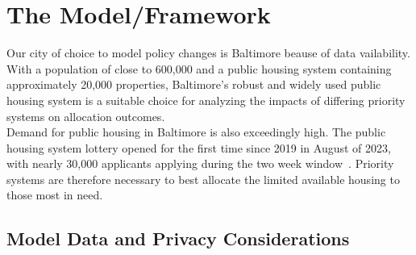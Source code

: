 \documentclass[11pt]{article}
\begin{document}
\newpage
\section{The Model/Framework}
\noindent
Our city of choice to model policy changes is Baltimore beause of data vailability. With a population of close to 600,000 and a public housing system containing approximately 20,000 properties, Baltimore's robust and widely used public housing system is a suitable choice for analyzing the impacts of differing priority systems on allocation outcomes. \\
\newline
Demand for public housing in Baltimore is also exceedingly high. The public housing system lottery opened for the first time since 2019 in August of 2023, with nearly 30,000 applicants applying during the two week window~\cite{emily_hofstaedter_28000_nodate}. Priority systems are therefore necessary to best allocate the limited available housing to those most in need. \\
\newline

\subsection{Model Data and Privacy Considerations}
\end{document}
